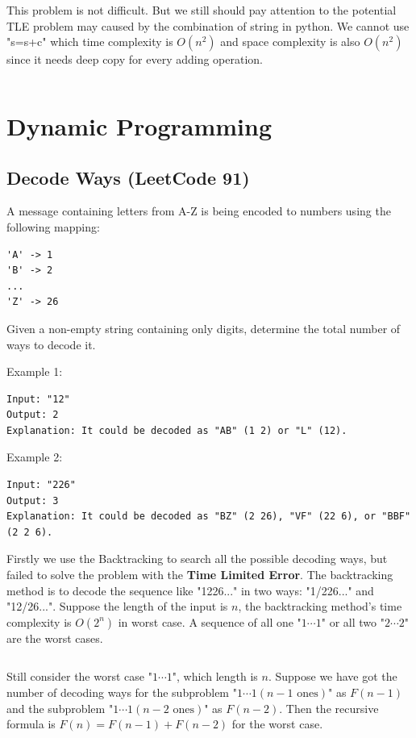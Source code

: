 \documentclass[11pt]{article}
\begin{document}
This problem is not difficult. 
But we still should pay attention to the potential TLE problem may caused by the combination of string in python. 
We cannot use "s=s+c" which time complexity is $O(n^2)$ and space complexity is also $O(n^2)$ since it needs deep copy for every adding operation.

\inputminted[breaklines=true,frame=leftline, linenos=true]{python}{src/frequencySort.py}

\section{Dynamic Programming}

\subsection{Decode Ways (LeetCode 91)}
A message containing letters from A-Z is being encoded to numbers using the following mapping:
\begin{verbatim}
'A' -> 1
'B' -> 2
...
'Z' -> 26	
\end{verbatim}
Given a non-empty string containing only digits, determine the total number of ways to decode it.

Example 1:
\begin{verbatim}
Input: "12"
Output: 2
Explanation: It could be decoded as "AB" (1 2) or "L" (12).
\end{verbatim}

Example 2:
\begin{verbatim}
Input: "226"
Output: 3
Explanation: It could be decoded as "BZ" (2 26), "VF" (22 6), or "BBF" (2 2 6).
\end{verbatim}

Firstly we use the Backtracking to search all the possible decoding ways, but failed to solve the problem with the \textbf{Time Limited Error}. 
The backtracking method is to decode the sequence like "1226..." in two ways: "1/226..." and "12/26...". 
Suppose the length of the input is $n$, the backtracking method's time complexity is $O(2^n)$ in worst case. 
A sequence of all one "$1 \cdots 1$" or all two "$2 \cdots 2$" are the worst cases. 

\inputminted[breaklines=true,frame=leftline, linenos=true]{python}{src/numDecodings.py}

Still consider the worst case "$1 \cdots 1$", which length is $n$. 
Suppose we have got the number of decoding ways for the subproblem "$1 \cdots 1 (n-1 \text{ ones})$" as $F(n-1)$ and the subproblem "$1 \cdots 1 (n-2 \text{ ones})$" as $F(n-2)$. 
Then the recursive formula is $F(n)=F(n-1)+F(n-2)$ for the worst case.
\end{document}

